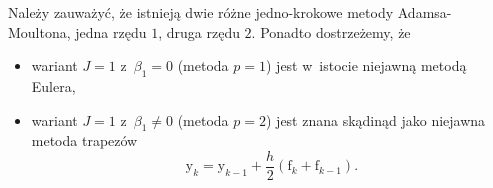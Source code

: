 \documentclass[paper=a4,DIV=12]{lpas}
\newcommand{\brm}[1]{\bm{\mathrm{#1}}}
\begin{document}
\begin{appendices}
Należy zauważyć, że istnieją dwie różne jedno-krokowe metody Adamsa-Moultona,
jedna rzędu $1$, druga rzędu $2$. Ponadto dostrzeżemy, że
\begin{itemize}
  \item wariant $J=1$ z~$\beta_1 = 0$ (metoda $p=1$) jest w~istocie niejawną
        metodą Eulera,
  \item wariant $J=1$ z~$\beta_1 \neq 0$ (metoda $p=2$) jest znana skądinąd jako
        niejawna metoda trapezów
        \begin{equation}
          \brm{y}_k = \brm{y}_{k-1} + \frac{h}{2} \left(\brm{f}_{k} + \brm{f}_{k-1}\right).
          \label{eq:GY62E}
        \end{equation}
\end{itemize}


\end{appendices}



\end{document}

